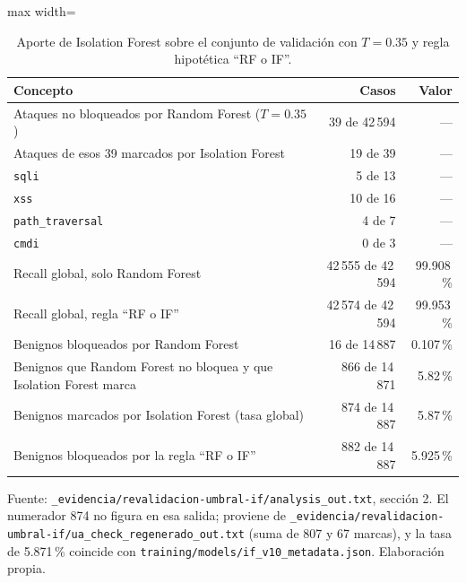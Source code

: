 \begin{table}[htbp]
\centering
\footnotesize
\setlength{\tabcolsep}{3pt}
\begin{adjustbox}{max width=\linewidth}
\begin{tabular}{|l|r|r|}
\hline
\textbf{Concepto} & \textbf{Casos} & \textbf{Valor} \\ \hline
Ataques no bloqueados por Random Forest ($T = 0.35$) & 39 de 42\,594 & --- \\ \hline
Ataques de esos 39 marcados por Isolation Forest & 19 de 39 & --- \\ \hline
\hspace{0.5em}\texttt{sqli} & 5 de 13 & --- \\ \hline
\hspace{0.5em}\texttt{xss} & 10 de 16 & --- \\ \hline
\hspace{0.5em}\texttt{path\_traversal} & 4 de 7 & --- \\ \hline
\hspace{0.5em}\texttt{cmdi} & 0 de 3 & --- \\ \hline
Recall global, solo Random Forest & 42\,555 de 42\,594 & 99.908\,\% \\ \hline
Recall global, regla ``RF o IF'' & 42\,574 de 42\,594 & 99.953\,\% \\ \hline
Benignos bloqueados por Random Forest & 16 de 14\,887 & 0.107\,\% \\ \hline
Benignos que Random Forest no bloquea y que Isolation Forest marca & 866 de 14\,871 & 5.82\,\% \\ \hline
Benignos marcados por Isolation Forest (tasa global) & 874 de 14\,887 & 5.87\,\% \\ \hline
Benignos bloqueados por la regla ``RF o IF'' & 882 de 14\,887 & 5.925\,\% \\ \hline
\end{tabular}
\end{adjustbox}
\caption{Aporte de Isolation Forest sobre el conjunto de validación con $T = 0.35$ y regla hipotética ``RF o IF''.}
\label{tabla:anexo-aporte-if}
\par\smallskip\footnotesize Fuente: \texttt{\_evidencia/revalidacion-umbral-if/analysis\_out.txt}, sección 2. El numerador 874 no figura en esa salida; proviene de \texttt{\_evidencia/revalidacion-umbral-if/ua\_check\_regenerado\_out.txt} (suma de 807 y 67 marcas), y la tasa de 5.871\,\% coincide con \texttt{training/models/if\_v10\_metadata.json}. Elaboración propia.
\end{table}

